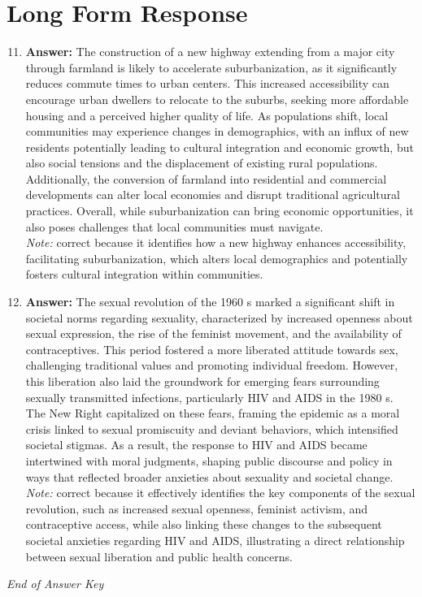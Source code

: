\documentclass[12pt]{article}
\begin{document}
\section*{Long Form Response}
\begin{enumerate}[label=\arabic*.]
\setcounter{enumi}{10}
\item \textbf{Answer:} The construction of a new highway extending from a major city through farmland is likely to accelerate suburbanization, as it significantly reduces commute times to urban centers. This increased accessibility can encourage urban dwellers to relocate to the suburbs, seeking more affordable housing and a perceived higher quality of life. As populations shift, local communities may experience changes in demographics, with an influx of new residents potentially leading to cultural integration and economic growth, but also social tensions and the displacement of existing rural populations. Additionally, the conversion of farmland into residential and commercial developments can alter local economies and disrupt traditional agricultural practices. Overall, while suburbanization can bring economic opportunities, it also poses challenges that local communities must navigate.
\\ \textit{Note:} correct because it identifies how a new highway enhances accessibility, facilitating suburbanization, which alters local demographics and potentially fosters cultural integration within communities.
\item \textbf{Answer:} The sexual revolution of the 1960 s marked a significant shift in societal norms regarding sexuality, characterized by increased openness about sexual expression, the rise of the feminist movement, and the availability of contraceptives. This period fostered a more liberated attitude towards sex, challenging traditional values and promoting individual freedom. However, this liberation also laid the groundwork for emerging fears surrounding sexually transmitted infections, particularly HIV and AIDS in the 1980 s. The New Right capitalized on these fears, framing the epidemic as a moral crisis linked to sexual promiscuity and deviant behaviors, which intensified societal stigmas. As a result, the response to HIV and AIDS became intertwined with moral judgments, shaping public discourse and policy in ways that reflected broader anxieties about sexuality and societal change.
\\ \textit{Note:} correct because it effectively identifies the key components of the sexual revolution, such as increased sexual openness, feminist activism, and contraceptive access, while also linking these changes to the subsequent societal anxieties regarding HIV and AIDS, illustrating a direct relationship between sexual liberation and public health concerns.
\end{enumerate}

\vfill
\noindent\textit{End of Answer Key}
\end{document}
